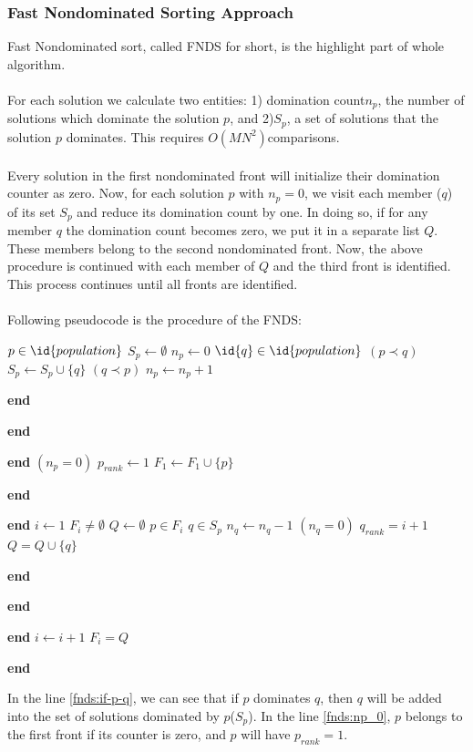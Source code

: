 \documentclass[a4paper, 11pt]{article}
\renewcommand{\End}{\kill\addtocounter{indent}{-1}\liprint\textbf{end} }
\begin{document}
\subsubsection{Fast Nondominated Sorting Approach}
Fast Nondominated sort, called FNDS for short, is the highlight part of whole algorithm.\\
\\
For each solution we calculate two entities: 1) domination count$n_p$, the number of solutions which dominate the
solution $p$, and 2)$S_p$, a set of solutions that the solution $p$  dominates. This requires $O(MN^2)$comparisons.\\
\\
Every solution in the first nondominated front will initialize their domination counter as zero.
Now, for each solution $p$ with $n_p=0$, we visit each member ($q$) of its set $S_p$ and reduce its domination count by one.
In doing so, if for any member $q$ the domination count becomes zero, we put it in a separate list $Q$. These
members belong to the second nondominated front. Now, the above procedure is continued with each member of $Q$ and the
third front is identified. This process continues until all fronts are identified.\\
\\
Following pseudocode is the procedure of the FNDS:
\begin{codebox}
\li \For $p \in \id{population}$
\li     \Do
\li         $S_p \gets \emptyset$
\li         $n_p \gets 0$
\li         \For $\id{q} \in \id{population}$
\li             \Do
\li                 \If $(p \prec q)$               \label{fnds:if-p-q}
\li                 \Then
\li                       $S_p \gets S_p \cup \{q\}$ \label{fnds:Sp-q}
\li                 \Else \If $(q \prec p)$
\li                       \Then
\li                             $n_p \gets n_p+1$   \label{fnds:np_1}
                       \End
                    \End
\li               \End
\li         \If $(n_p = 0)$                     \label{fnds:np_0}
\li             \Then
\li                   $p_{rank} \gets 1$
\li                   $F_1 \gets F_1 \cup \{p\}$
\li             \End
\li    \End
\li $i \gets 1$                                 \label{fnds:init_fcntr}
\li \While $F_i \neq \emptyset$
\li     \Do
\li         $Q \gets \emptyset$                 \label{fnds:Q_empty}
\li         \For $p \in F_i$
\li             \Do
\li                 \For $q \in S_p$
\li                     \Do
\li                         $n_q \gets n_q-1$
\li                         \If $(n_q=0)$       \label{fnds:nq_0}
\li                             \Then
\li                                   $q_{rank}=i+1$
\li                                   $Q=Q\cup\{q\}$
                                \End
                        \End
\li             \End
\li         $i \gets i+1$
\li         $F_i=Q$
\li  \End
\end{codebox}
In the line \ref{fnds:if-p-q}, we can see that if $p$ dominates $q$, then $q$ will be added into the set of solutions dominated by $p$($S_p$). In the line \ref{fnds:np_0}, $p$ belongs to the first front if its counter is zero, and $p$ will have $p_{rank}=1$.
\end{document}
